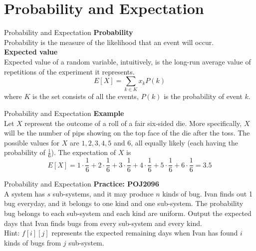\documentclass[mathserif,10pt]{beamer}
\begin{document}
\section{Probability and Expectation}

\begin{frame}{Probability and Expectation}
\textbf{Probability}\\ 
Probability is the measure of the likelihood that an event will occur. \\[0.5cm]
\pause
\textbf{Expected value} \\ 
Expected value of a random variable, intuitively, is the long-run average value of repetitions of the experiment it represents.
$$E[X] = \sum_{k\in K} x_kP(k)$$
where $K$ is the set consists of all the events, $P(k)$ is the probability of event $k$.
\end{frame}

\begin{frame}{Probability and Expectation}
\textbf{Example} \\[0.5cm]
Let $X$ represent the outcome of a roll of a fair six-sided die. More specifically, $X$ will be the number of pips showing on the top face of the die after the toss. The possible values for $X$ are $1, 2, 3, 4, 5$ and $6$, all equally likely (each having the probability of $\frac16$). The expectation of $X$ is
$$E[X] = 1\cdot \frac16 + 2\cdot \frac16 + 3\cdot \frac16 + 4\cdot \frac16 + 5\cdot \frac16 + 6\cdot \frac16 = 3.5$$
\end{frame}


\begin{frame}{Probability and Expectation}
\textbf{Practice: POJ2096} \\[0.5cm]
A system has $s$ sub-systems, and it may produce $n$ kinds of bug. Ivan finds out 1 bug everyday, and it belongs to one kind and one sub-system. The probability bug belongs to each sub-system and each kind are uniform. Output the expected days that Ivan finds bugs from every sub-system and every kind. \\[0.5cm]
\pause
Hint: $f[i][j]$ represents the expected remaining days when Ivan has found $i$ kinds of bugs from $j$ sub-system.
\end{frame}
\end{document}

